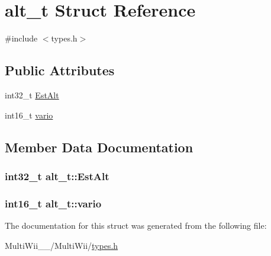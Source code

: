 \hypertarget{structalt__t}{\section{alt\-\_\-t Struct Reference}
\label{structalt__t}
}


{\ttfamily \#include $<$types.\-h$>$}

\subsection*{Public Attributes}
\begin{DoxyCompactItemize}
\item 
int32\-\_\-t \hyperlink{structalt__t_ab5a375536e151cac555d0309c0a9bc56}{Est\-Alt}
\item 
int16\-\_\-t \hyperlink{structalt__t_a5ce7bff3cae66763f0b19784893fd2ed}{vario}
\end{DoxyCompactItemize}


\subsection{Member Data Documentation}
\hypertarget{structalt__t_ab5a375536e151cac555d0309c0a9bc56}{
\subsubsection[{Est\-Alt}]{\setlength{\rightskip}{0pt plus 5cm}int32\-\_\-t alt\-\_\-t\-::\-Est\-Alt}}\label{structalt__t_ab5a375536e151cac555d0309c0a9bc56}
\hypertarget{structalt__t_a5ce7bff3cae66763f0b19784893fd2ed}{
\subsubsection[{vario}]{\setlength{\rightskip}{0pt plus 5cm}int16\-\_\-t alt\-\_\-t\-::vario}}\label{structalt__t_a5ce7bff3cae66763f0b19784893fd2ed}


The documentation for this struct was generated from the following file\-:\begin{DoxyCompactItemize}
\item 
Multi\-Wii\-\_\-\_/\-Multi\-Wii/\hyperlink{MultiWii__2__4_2MultiWii_2types_8h}{types.\-h}\end{DoxyCompactItemize}
